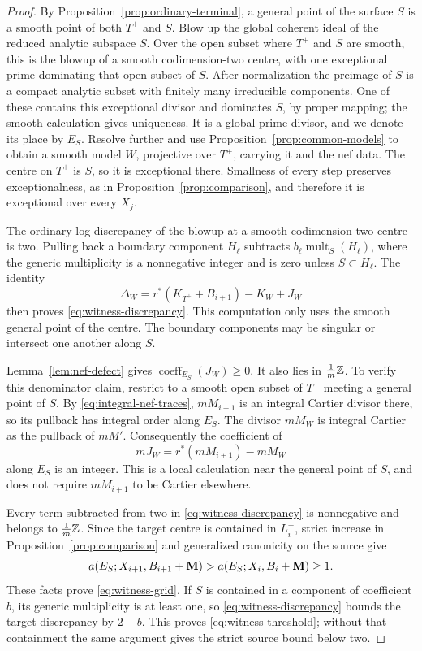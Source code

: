 \begin{proof}
By Proposition~\ref{prop:ordinary-terminal}, a general point of the
surface $S$ is a smooth point of both $T^+$ and $S$.
Blow up the global coherent
ideal of the reduced analytic subspace $S$.  Over the open subset where
$T^+$ and $S$ are smooth, this is the blowup of a smooth codimension-two
centre, with one exceptional prime dominating that open subset of $S$.
After normalization the preimage of $S$ is a compact analytic subset
with finitely many irreducible components.  One of these contains this
exceptional divisor and dominates $S$, by proper mapping; the smooth
calculation gives uniqueness.  It is a global prime divisor, and we
denote its place by $E_S$.  Resolve further and use
Proposition~\ref{prop:common-models} to obtain a smooth model $W$,
projective over $T^+$, carrying it and the nef data.  The centre on $T^+$ is $S$, so it is
exceptional there.  Smallness of every step preserves exceptionalness,
as in Proposition~\ref{prop:comparison}, and therefore it is exceptional
over every $X_j$.

The ordinary log discrepancy of the blowup at a smooth codimension-two
centre is two.  Pulling back a boundary component $H_{\ell}$ subtracts
$b_{\ell}\operatorname{mult}_S(H_{\ell})$, where the generic
multiplicity is a nonnegative integer and is zero unless $S\subset
H_{\ell}$.  The identity
\[
 \Delta_W=r^*(K_{T^+}+B_{i+1})-K_W+J_W
\]
then proves \eqref{eq:witness-discrepancy}.  This computation only uses
the smooth general point of the centre.  The boundary components may be
singular or intersect one another along $S$.

Lemma~\ref{lem:nef-defect} gives
$\operatorname{coeff}_{E_S}(J_W)\geq0$.  It also lies in
$\tfrac1m\mathbb Z$.  To verify this denominator claim, restrict to a smooth
open subset of $T^+$ meeting a general point of $S$.
By \eqref{eq:integral-nef-traces}, $mM_{i+1}$ is an integral Cartier
divisor there, so its pullback has integral order along $E_S$.
The divisor $mM_W$ is integral Cartier as the pullback of $mM'$.
Consequently the coefficient of
\[
 mJ_W=r^*(mM_{i+1})-mM_W
\]
along $E_S$ is an integer.  This is a local calculation near the general
point of $S$, and does not require $mM_{i+1}$ to be Cartier elsewhere.

Every term subtracted from two in \eqref{eq:witness-discrepancy} is
nonnegative and belongs to $\tfrac1m\mathbb Z$.  Since the target centre is
contained in $L_i^+$, strict increase in
Proposition~\ref{prop:comparison} and generalized canonicity on the
source give
\[
 a(E_S;X_{i+1},B_{i+1}+\mathbf M)
 >a(E_S;X_i,B_i+\mathbf M)\geq1.
\]
These facts prove \eqref{eq:witness-grid}.  If $S$ is contained in a component
of coefficient $b$, its generic multiplicity is at least one, so
\eqref{eq:witness-discrepancy} bounds the target discrepancy by $2-b$.
This proves \eqref{eq:witness-threshold}; without that containment the
same argument gives the strict source bound below two.
\end{proof}

